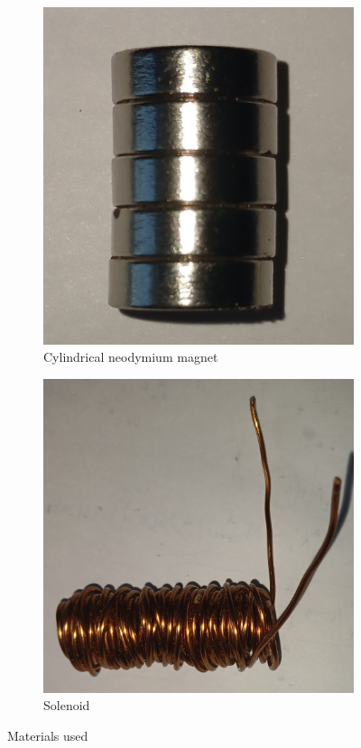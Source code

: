 \begin{figure}[ht]
	\centering
	\begin{subfigure}[c]{0.4\textwidth}
		\centering
		\includegraphics[height = 0.2\textheight]{figures/magnets.jpg}
		\caption{Cylindrical neodymium magnet}
		\label{fig:magnets}
	\end{subfigure}
	\begin{subfigure}[c]{0.4\textwidth}
		\centering
		\includegraphics[height = 0.2\textheight]{figures/solenoid.jpg}
		\caption{Solenoid}
		\label{fig:solenoid}
	\end{subfigure}
	\caption{Materials used}
\end{figure}

